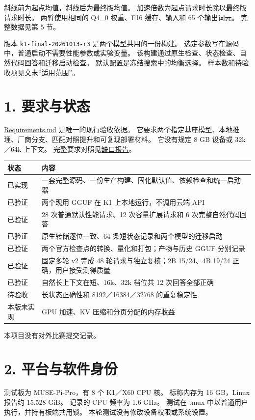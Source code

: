 \documentclass[10pt,a4paper,fontset=none]{ctexart}
\begin{document}
斜线前为起点均值，斜线后为最终版均值。
加速倍数为起点请求时长除以最终版请求时长。 两臂使用相同的 Q4\_0
权重、F16 缓存、输入和 65 个输出词元。 完整数据见第 5 节。

版本 \nolinkurl{k1-final-20261013-r3} 是两个模型共用的一份构建。
选定参数写在源码中，普通启动不需要性能参数或实验变量。
该构建通过原生检查、状态检查、自然代码回答和迁移启动检查。
默认配置是冻结搜索中的均衡选择。 样本数和待验收项见文末``适用范围''。

\hypertarget{ux8981ux6c42ux4e0eux72b6ux6001}{%
\section{1. 要求与状态}\label{ux8981ux6c42ux4e0eux72b6ux6001}}

\href{https://github.com/MoyaMryia/riscv-accl/blob/main/Requirements.md}{Requirements.md}
是唯一的现行验收依据。
它要求两个指定基座模型、本地推理、厂商分支、匹配对照提升和可复现部署材料。
它没有规定 8 GB 设备或 32k／64k 上下文。
完整要求对照见\href{https://github.com/MoyaMryia/riscv-accl/blob/main/spacemit/reports/2026-10-13-requirements-gap.md}{缺口报告}。

\begin{longtable}[]{@{}ll@{}}
\toprule
状态 & 内容\tabularnewline
\midrule
\endhead
已实现 &
一套完整源码、一份生产构建、固化默认值、依赖检查和统一启动器\tabularnewline
已验证 & 两个现用 GGUF 在 K1 上本地运行，不调用云端 API\tabularnewline
已验证 & 28 次普通默认性能请求、12 次容量扩展请求和 6
次完整自然代码回答\tabularnewline
已验证 & 原生转储逐位一致、64
条短状态记录和两个模型的迁移启动\tabularnewline
已验证 & 两个官方检查点的转换、量化和打包；产物与历史 GGUF
分别记录\tabularnewline
已验证 & 固定多轮 v2 完成 48 轮请求与独立复核；2B 15/24、4B 19/24
正确，用户接受测得质量\tabularnewline
已验证 & 自然长上下文在短、16k、32k 档位共 12
次回答全部正确\tabularnewline
待验收 & 长状态正确性和 8192／16384／32768 的重复稳定性\tabularnewline
本版未实现 & GPU 加速、KV 压缩和分页分配的内存收益\tabularnewline
\bottomrule
\end{longtable}

本项目没有对外比赛提交记录。

\hypertarget{ux5e73ux53f0ux4e0eux8f6fux4ef6ux8eabux4efd}{%
\section{2.
平台与软件身份}\label{ux5e73ux53f0ux4e0eux8f6fux4ef6ux8eabux4efd}}

测试板为 MUSE-Pi-Pro，有 8 个 K1／X60 CPU 核。 标称内存为 16 GB，Linux
报告约 15.528 GiB。 记录的 CPU 频率为 1.6 GHz。 测试在 tmux
中以普通用户执行，并持有板端共用锁。
本轮测试没有修改设备权限或系统设置。
\end{document}
